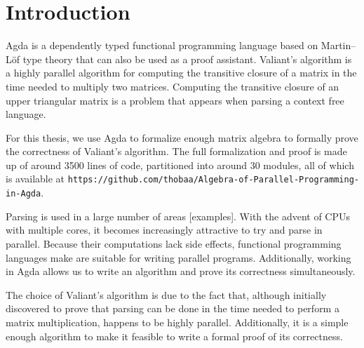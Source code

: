\section{Introduction}
Agda is a dependently typed functional programming language based on Martin--Löf type theory that can also be used as a proof assistant. Valiant's algorithm is a highly parallel algorithm for computing the transitive closure of a matrix in the time needed to multiply two matrices. Computing the transitive closure of an upper triangular matrix is a problem that appears when parsing a context free language.

For this thesis, we use Agda to formalize enough matrix algebra to formally prove the correctness of Valiant's algorithm.
The full formalization and proof is made up of around 3500 lines of code, partitioned into around 30 modules, all of which is available at \verb¦https://github.com/thobaa/Algebra-of-Parallel-Programming-in-Agda¦.

% 


Parsing is used in a large number of areas [examples].
With the advent of CPUs with multiple cores, it becomes increasingly attractive to try and parse in parallel.
Because their computations lack side effects, functional programming languages make are suitable for writing parallel programs.
Additionally, working in Agda allows us to write an algorithm and prove its correctness simultaneously. %

The choice of Valiant's algorithm is due to the fact that, although initially discovered to prove that parsing can be done in the time needed to perform a matrix multiplication, happens to be highly parallel. Additionally, it is a simple enough algorithm to make it feasible to write a formal proof of its correctness.

